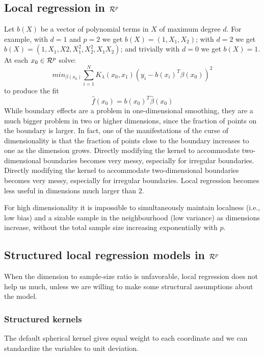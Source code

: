 \subsection{Local regression in $\CMcal{R}^p$}
Let $b(X)$ be a vector of polynomial terms in $X$ of maximum degree $d$. For example, with $d = 1$ and $p = 2$ we get $b(X) = (1,X_1,X_2)$; with $d = 2$ we get $b(X) = (1, X_1, X2, X_1^2, X_2^2, X_1X_2)$; and trivially with $d = 0$ we get $b(X) = 1$. At each $x_0 \in \CMcal{R}^p$ solve:
\begin{equation}
min_{\beta(x_0)} \sum_{i=1}^N K_\lambda (x_0, x_1)\left(y_i - b(x_i)^T\beta\left(x_0\right)\right)^2
\end{equation}
to produce the fit
\begin{equation}
\hat{f} (x_0) = b(x_0)^T\hat{\beta}(x_0)
\end{equation}
While boundary effects are a problem in one-dimensional smoothing, they are a much bigger problem in two or higher dimensions, since the fraction of points on the boundary is larger. In fact, one of the manifestations of the curse of dimensionality is that the fraction of points close to the boundary increases to one as the dimension grows. Directly modifying the kernel to accommodate two-dimensional boundaries becomes very messy, especially for irregular boundaries.  Directly modifying the kernel to accommodate two-dimensional boundaries becomes very messy, especially for irregular boundaries.
Local regression becomes less useful in dimensions much larger than $2$.

For high dimensionality it is impossible to simultaneously maintain localness (i.e., low bias) and a sizable sample in the neighbourhood (low variance) as dimensions increase, without the total sample size increasing exponentially with $p$.

\subsection{Structured local regression models in $\CMcal{R}^p$}
When the dimension to sample-size ratio is unfavorable, local regression does not help us much, unless we are willing to make some structural assumptions about the model.

\subsubsection{Structured kernels}
The default spherical kernel gives equal weight to each coordinate and we can standardize the variables to unit deviation.

